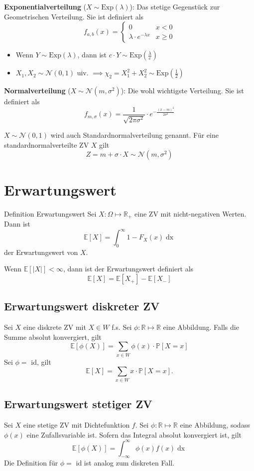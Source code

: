 \documentclass[a4paper,10pt]{article}
\def\R{\mathbb{R}}
\def\P{\mathbb{P}}
\def\E{\mathbb{E}}
\begin{document}
\noindent \textbf{Exponentialverteilung} (\(X \sim \text{Exp}(\lambda)\)): Das stetige Gegenstück zur Geometrischen Verteilung. Sie ist definiert als
\[f_{a,b}(x) = \begin{cases}
		0                            & x < 0    \\
		\lambda \cdot e^{-\lambda x} & x \geq 0
	\end{cases}\]
\begin{itemize}
	\item Wenn \(Y\sim \text{Exp}(\lambda)\), dann ist \(c \cdot Y \sim \text{Exp}(\frac{\lambda}{c})\)
	\item \(X_1, X_2 \sim \mathcal{N}(0,1)\) uiv. \(\implies \chi_2 = X_1^2 +X_2^2 \sim \text{Exp}(\frac{1}{2})\)
\end{itemize}

\noindent \textbf{Normalverteilung} (\(X \sim \mathcal{N}(m, \sigma^2)\)): Die wohl wichtigste Verteilung. Sie ist definiert als
\[f_{m, \sigma}(x) = \frac{1}{\sqrt{2 \pi \sigma^2}} \cdot e^{-\frac{(x-m)^2}{2 \sigma^2}}\]

\(X \sim \mathcal{N}(0,1)\) wird auch Standardnormalverteilung genannt. Für eine standardnormalverteilte ZV \(X\) gilt
\[Z = m +\sigma \cdot X \sim \mathcal{N}(m, \sigma^2)\]

\section{Erwartungswert}
\begin{mainbox}{Definition Erwartungswert}
	Sei \(X: \Omega \mapsto \R_+\) eine ZV mit nicht-negativen Werten. Dann ist
	\[\E[X] = \int_0^\infty 1- F_X(x) \mathop{dx}\]
	der Erwartungswert von \(X\).
\end{mainbox}
Wenn \(\E[|X|] < \infty\), dann ist der Erwartungswert definiert als
\[\E[X] = \E[X_+] - \E[X_-]\]

\subsection{Erwartungswert diskreter ZV}
Sei \(X\) eine diskrete ZV mit \(X \in W\) f.s. Sei \(\phi: \R \mapsto \R\) eine Abbildung. Falls die Summe absolut konvergiert, gilt
\[\E[\phi(X)] = \sum_{x\in W} \phi(x)\cdot \P[X=x]\]
Sei \(\phi = \) id, gilt
\[
	\E[X] = \sum_{x\in W} x \cdot \P[X=x]
	.\]

\subsection{Erwartungswert stetiger ZV}
Sei \(X\) eine stetige ZV mit Dichtefunktion \(f\). Sei \(\phi :\R\mapsto \R\) eine Abbildung, sodass \(\phi(x)\) eine Zufallsvariable ist. Sofern das Integral absolut konvergiert ist, gilt
\[\E[\phi(X)] = \int_{-\infty}^{\infty}\phi(x)f(x) \mathop{dx}\]
Die Definition für \(\phi = \) id ist analog zum diskreten Fall.
\end{document}
